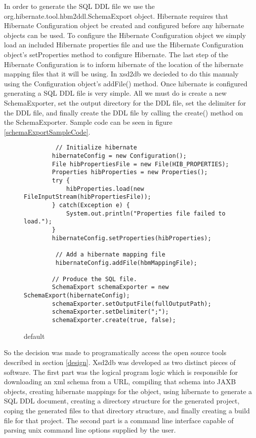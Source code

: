 In order to generate the SQL DDL file we use the org.hibernate.tool.hbm2ddl.SchemaExport object.  Hibernate requires that Hibernate Configuration object be created and configured before any hibernate objects can be used.  To configure the Hibernate Configuration object we simply load an included Hibernate properties file and use the Hibernate Configuration object's setProperties method to configure Hibernate.  The last step of the Hibernate Configuration is to inform hibernate of the location of the hibernate mapping files that it will be using.  In xsd2db we decieded to do this manualy using the Configuration object's addFile() method.   Once hibernate is configured generating a SQL DDL file is very simple.  All we must do is create a new SchemaExporter, set the output directory for the DDL file, set the delimiter for the DDL file, and finally create the DDL file by calling the create() method on the SchemaExporter.  Sample code can be seen in figure \ref{schemaExportSampleCode}.
\begin{figure}[htbp]
\begin{center}
\begin{verbatim}
         // Initialize hibernate
        hibernateConfig = new Configuration();
        File hibPropertiesFile = new File(HIB_PROPERTIES);
        Properties hibProperties = new Properties();
        try {
            hibProperties.load(new FileInputStream(hibPropertiesFile));
        } catch(Exception e) {
            System.out.println("Properties file failed to load.");
        }
        hibernateConfig.setProperties(hibProperties);

         // Add a hibernate mapping file
         hibernateConfig.addFile(hbmMappingFile);
         
        // Produce the SQL file.
        SchemaExport schemaExporter = new SchemaExport(hibernateConfig);
        schemaExporter.setOutputFile(fullOutputPath);
        schemaExporter.setDelimiter(";");
        schemaExporter.create(true, false);
\end{verbatim}
\caption{default}
\label{default}
\end{center}
\end{figure}



  So the decision was made to programatically access the open source tools described in section \ref{design}.  
Xsd2db was developed as two distinct pieces of software.  The first part was the logical program logic which is responsible for downloading an xml schema from a URL, compiling that schema into JAXB objects, creating hibernate mappings for the object, using hibernate to generate a SQL DDL document, creating a directory structure for the generated project, coping the generated files to that directory structure, and finally creating a build file for that project.  The second part is a command line interface capable of parsing unix command line options supplied by the user.  

